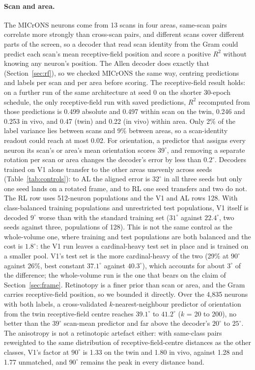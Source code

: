 \documentclass[11pt]{article}
\newcommand{\Rsq}{R^{2}}
\begin{document}
\paragraph{Scan and area.} The MICrONS neurons come from 13 scans in four areas, same-scan pairs correlate more strongly than cross-scan pairs, and different scans cover different parts of the screen, so a decoder that read scan identity from the Gram could predict each scan's mean receptive-field position and score a positive $\Rsq$ without knowing any neuron's position. The Allen decoder does exactly that (Section~\ref{sec:rf}), so we checked MICrONS the same way, centring predictions and labels per scan and per area before scoring. The receptive-field result holds: on a further run of the same architecture at seed 0 on the shorter 30-epoch schedule, the only receptive-field run with saved predictions, $\Rsq$ recomputed from those predictions is 0.499 absolute and 0.497 within scan on the twin, 0.246 and 0.253 in vivo, and 0.47 (twin) and 0.22 (in vivo) within area. Only 2\% of the label variance lies between scans and 9\% between areas, so a scan-identity readout could reach at most 0.02. For orientation, a predictor that assigns every neuron its scan's or area's mean orientation scores $39^\circ$, and removing a separate rotation per scan or area changes the decoder's error by less than $0.2^\circ$. Decoders trained on V1 alone transfer to the other areas unevenly across seeds (Table~\ref{tab:controls}): to AL the aligned error is $32^\circ$ in all three seeds but only one seed lands on a rotated frame, and to RL one seed transfers and two do not. The RL row uses 512-neuron populations and the V1 and AL rows 128. With class-balanced training populations and unrestricted test populations, V1 itself is decoded $9^\circ$ worse than with the standard training set ($31^\circ$ against $22.4^\circ$, two seeds against three, populations of 128). This is not the same control as the whole-volume one, where training and test populations are both balanced and the cost is $1.8^\circ$: the V1 run leaves a cardinal-heavy test set in place and is trained on a smaller pool. V1's test set is the more cardinal-heavy of the two (29\% at $90^\circ$ against 26\%, best constant $37.1^\circ$ against $40.3^\circ$), which accounts for about $3^\circ$ of the difference; the whole-volume run is the one that bears on the claim of Section~\ref{sec:frame}. Retinotopy is a finer prior than scan or area, and the Gram carries receptive-field position, so we bounded it directly. Over the 4,835 neurons with both labels, a cross-validated $k$-nearest-neighbour predictor of orientation from the twin receptive-field centre reaches $39.1^\circ$ to $41.2^\circ$ ($k$ = 20 to 200), no better than the $39^\circ$ scan-mean predictor and far above the decoder's $20^\circ$ to $25^\circ$. The anisotropy is not a retinotopic artefact either: with same-class pairs reweighted to the same distribution of receptive-field-centre distances as the other classes, V1's factor at $90^\circ$ is 1.33 on the twin and 1.80 in vivo, against 1.28 and 1.77 unmatched, and $90^\circ$ remains the peak in every distance band.
\end{document}
